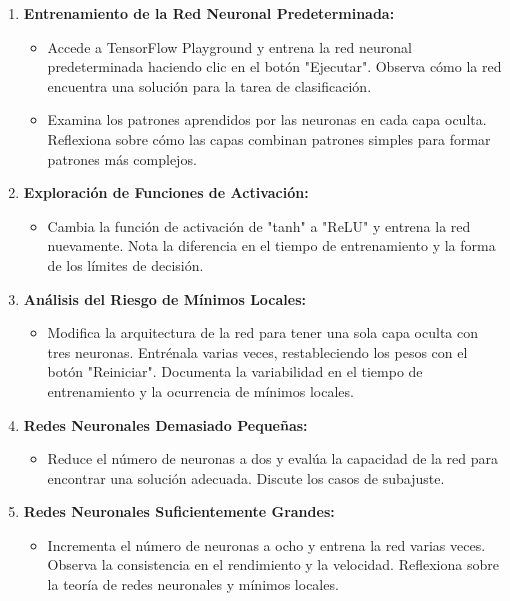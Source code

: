 \documentclass[11pt]{article}
\begin{document}
\begin{enumerate}
\item \textbf{\textbf{Entrenamiento de la Red Neuronal Predeterminada:}}
\begin{itemize}
\item Accede a TensorFlow Playground y entrena la red neuronal
predeterminada haciendo clic en el botón "Ejecutar". Observa cómo
la red encuentra una solución para la tarea de clasificación.
\item Examina los patrones aprendidos por las neuronas en cada capa
oculta. Reflexiona sobre cómo las capas combinan patrones simples
para formar patrones más complejos.
\end{itemize}

\item \textbf{\textbf{Exploración de Funciones de Activación:}}
\begin{itemize}
\item Cambia la función de activación de "tanh" a "ReLU" y entrena la
red nuevamente. Nota la diferencia en el tiempo de entrenamiento
y la forma de los límites de decisión.
\end{itemize}

\item \textbf{\textbf{Análisis del Riesgo de Mínimos Locales:}}
\begin{itemize}
\item Modifica la arquitectura de la red para tener una sola capa
oculta con tres neuronas. Entrénala varias veces, restableciendo
los pesos con el botón "Reiniciar". Documenta la variabilidad en
el tiempo de entrenamiento y la ocurrencia de mínimos locales.
\end{itemize}

\item \textbf{\textbf{Redes Neuronales Demasiado Pequeñas:}}
\begin{itemize}
\item Reduce el número de neuronas a dos y evalúa la capacidad de la
red para encontrar una solución adecuada. Discute los casos de
subajuste.
\end{itemize}

\item \textbf{\textbf{Redes Neuronales Suficientemente Grandes:}}
\begin{itemize}
\item Incrementa el número de neuronas a ocho y entrena la red varias
veces. Observa la consistencia en el rendimiento y la
velocidad. Reflexiona sobre la teoría de redes neuronales y
mínimos locales.
\end{itemize}


\end{enumerate}
\end{document}
